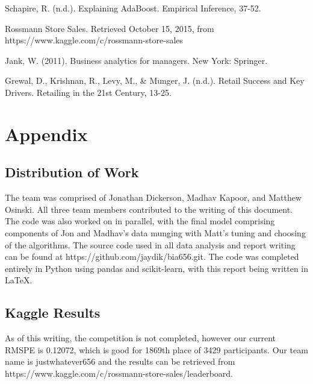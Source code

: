 \documentclass[DIV=calc, paper=a4, fontsize=11pt]{scrartcl}	 %
\begin{document}

\begin{thebibliography}{99} %

Schapire, R. (n.d.). Explaining AdaBoost. Empirical Inference, 37-52. 


Rossmann Store Sales. Retrieved October 15, 2015, from https://www.kaggle.com/c/rossmann-store-sales


Jank, W. (2011). Business analytics for managers. New York: Springer. 


Grewal, D., Krishnan, R., Levy, M., \& Munger, J. (n.d.). Retail Success and Key 
Drivers. Retailing in the 21st Century, 13-25.

\end{thebibliography}


\newpage

\section*{Appendix}

\subsection*{Distribution of Work}
The team was comprised of Jonathan Dickerson, Madhav Kapoor, and Matthew Osinski. All three team members contributed to the writing of this document. The code was also worked on in parallel, with the final model comprising components of Jon and Madhav's data munging with Matt's tuning and choosing of the algorithms. The source code used in all data analysis and report writing can be found at https://github.com/jaydik/bia656.git. The code was completed entirely in Python using pandas and scikit-learn, with this report being written in \LaTeX. 

\subsection*{Kaggle Results}
As of this writing, the competition is not completed, however our current RMSPE is 0.12072, which is good for 1869th place of 3429 participants. Our team name is justwhatever656 and the results can be retrieved from https://www.kaggle.com/c/rossmann-store-sales/leaderboard. 
\end{document}
